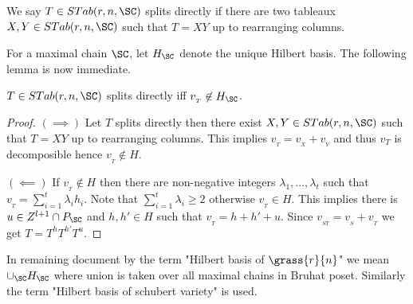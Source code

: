 
\begin{definition}
    We say \(T \in STab(r,n,\SC)\) splits directly 
    if there are two tableaux \(X,Y \in STab(r,n,\SC)\) such that \(T=XY\) up to rearranging columns.
\end{definition}

For a maximal chain $\SC$, let $H_{\SC}$ denote the unique Hilbert basis. The following lemma is now immediate.
\begin{lemma}
    \(T \in STab(r,n,\SC)\) splits directly iff \(v_{_T} \not\in H_{\SC}\). 
\end{lemma}
\begin{proof}
    \((\implies)\)
    Let \(T\) splits directly then there exist \(X,Y \in STab(r,n,\SC)\) such that 
    \(T = XY\) up to rearranging columns. This implies \(v_{_T} = v_{_X} + v_{_Y}\) 
    and thus \(v_{T}\) is decomposible hence \(v_{_T} \not\in H\).

    \((\impliedby)\) If \(v_{_T} \not\in H\) then there are non-negative integers 
    \(\lambda_1,...,\lambda_t\) such that \(v_{_T} = \sum_{i=1}^t \lambda_i h_i\). 
    Note that \(\sum_{i=1}^t \lambda_i \ge 2\) otherwise \(v_{_T} \in H\). 
    This implies there is \(u\in Z^{l+1}\cap P_{\SC} \) and \(h,h' \in H\) 
    such that \(v_{_T} = h + h' + u\). 
    Since \(v_{_{ST}} = v_{_S} + v_{_T}\) we get \(T=T^{h}T^{h'}T^u\).     
\end{proof}

In remaining document by the term "Hilbert basis of \(\grass{r}{n}\)" we mean \(\cup_{\SC} H_{\SC}\) where union is taken over all maximal chains in Bruhat poset. Similarly the term "Hilbert basis of schubert variety" is used.




